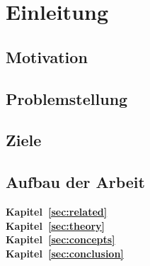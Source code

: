 %
\chapter{Einleitung}
\label{sec:intro}


\section{Motivation}
\label{sec:intro:motivation}

\section{Problemstellung}
\label{sec:intro:problem}

\section{Ziele}
\label{sec:intro:goals}

\section{Aufbau der Arbeit}
\label{sec:intro:structure}

\textbf{Kapitel~\ref{sec:related}} \\[0.2em]

\textbf{Kapitel~\ref{sec:theory}} \\[0.2em]

\textbf{Kapitel~\ref{sec:concepts}} \\[0.2em]

\textbf{Kapitel~\ref{sec:conclusion}} \\[0.2em]
